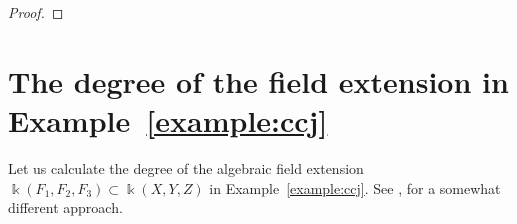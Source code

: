 \documentclass[11pt,reqno]{amsart}
\theoremstyle{definition}
\newcommand{\mbk}{\mbox{$\Bbbk$}}
\newcommand{\mfm}{\mbox{$\mathfrak{m}$}}
\begin{document}
\begin{proof}

\begin{comment}
Alternativa 3
For each $i=\ldots,v_F$, let $K_i=\mbk[X]/\mfm_i$ which, by the Zariski Lemma, 
is a finite algebraic extension of $\mbk$. Let $L=K_1\cdots K_{v_F}$ be the composite field of the $K_i$. 
\end{comment}
\end{proof}

\section{The degree of the field extension in Example~\ref{example:ccj}}

Let us calculate the degree of the algebraic field extension $\mbk(F_1,F_2,F_3)\subset \mbk(X,Y,Z)$ in Example~\ref{example:ccj}. See \cite[page~5, before Remark~4.4]{ai}, for a somewhat different approach.
\end{document}
